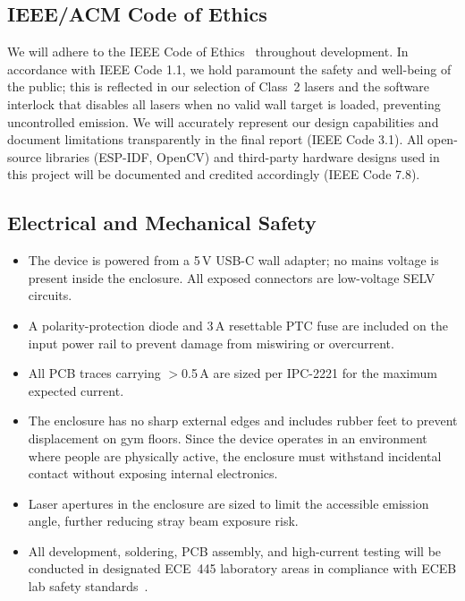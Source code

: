 \documentclass[12pt]{extarticle}
\begin{document}
\subsection{IEEE/ACM Code of Ethics}

We will adhere to the IEEE Code of Ethics~\cite{ieee_ethics} throughout development. In
accordance with IEEE Code 1.1, we hold paramount the safety and well-being of the public; this
is reflected in our selection of Class~2 lasers and the software interlock that disables all
lasers when no valid wall target is loaded, preventing uncontrolled emission. We will
accurately represent our design capabilities and document limitations transparently in the
final report (IEEE Code 3.1). All open-source libraries (ESP-IDF, OpenCV) and third-party
hardware designs used in this project will be documented and credited accordingly (IEEE Code
7.8).

\subsection{Electrical and Mechanical Safety}

\begin{itemize}
    \item The device is powered from a 5\,V USB-C wall adapter; no mains voltage is present
    inside the enclosure. All exposed connectors are low-voltage SELV circuits.

    \item A polarity-protection diode and 3\,A resettable PTC fuse are included on the input
    power rail to prevent damage from miswiring or overcurrent.

    \item All PCB traces carrying $>$0.5\,A are sized per IPC-2221 for the maximum expected
    current.

    \item The enclosure has no sharp external edges and includes rubber feet to prevent
    displacement on gym floors. Since the device operates in an environment where people are
    physically active, the enclosure must withstand incidental contact without exposing
    internal electronics.

    \item Laser apertures in the enclosure are sized to limit the accessible emission angle,
    further reducing stray beam exposure risk.

    \item All development, soldering, PCB assembly, and high-current testing will be conducted
    in designated ECE~445 laboratory areas in compliance with ECEB lab safety
    standards~\cite{ece445safety}.
\end{itemize}
\end{document}
